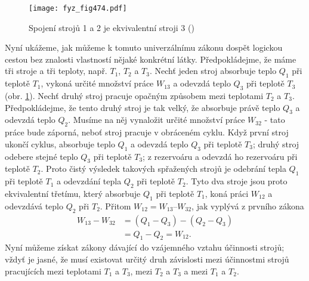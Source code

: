     \begin{figure}[ht!] %
      \centering
      \texttt{[image: fyz\_fig474.pdf]}
      \caption{Spojení strojů 1 a 2 je ekvivalentní stroji 3 (\cite[s.~707]{Feynman01})}
      \label{fyz:fig474}
    \end{figure}

    Nyní ukážeme, jak můžeme k tomuto univerzálnímu zákonu dospět logickou cestou bez znalosti
    vlastností nějaké konkrétní látky. Předpokládejme, že máme tři stroje a tři teploty, např.
    \(T_1\), \(T_2\) a \(T_3\). Nechť jeden stroj absorbuje teplo \(Q_1\) při teplotě \(T_1\),
    vykoná určité množství práce \(W_{13}\) a odevzdá teplo \(Q_3\) při teplotě \(T_3\) (obr.
    \ref{fyz:fig474}). Nechť druhý stroj pracuje opačným způsobem mezi teplotami \(T_2\) a \(T_3\).
    Předpokládejme, že tento druhý stroj je tak velký, že absorbuje právě teplo \(Q_3\) a odevzdá
    teplo \(Q_2\). Musíme na něj vynaložit určité množství práce \(W_{32}\) - tato práce bude
    záporná, neboť stroj pracuje v obráceném cyklu. Když první stroj ukončí cyklus, absorbuje teplo
    \(Q_1\) a odevzdá teplo \(Q_3\) při teplotě \(T_3\); druhý stroj odebere stejné teplo \(Q_3\)
    při teplotě \(T_3\); z rezervoáru a odevzdá ho rezervoáru při teplotě \(T_2\). Proto čistý
    výsledek takových spřažených strojů je odebrání tepla \(Q_1\) při teplotě \(T_1\) a odevzdání
    tepla \(Q_2\) při teplotě \(T_2\). Tyto dva stroje jsou proto ekvivalentní třetímu, který
    absorbuje \(Q_1\) při teplotě \(T_1\), koná práci \(W_{12}\) a odevzdává teplo \(Q_2\) při
    \(T_2\). Přitom \(W_{12} = W_{13} – W_{32}\), jak vyplývá z prvního zákona
    \begin{align}
      W_{13}−W_{32}&=(Q_1-Q_3)-(Q_2-Q_3) \nonumber \\
                   &=Q_1-Q_2=W_{12}.     \label{fyz:eq678}
    \end{align}
    Nyní můžeme získat zákony dávající do vzájemného vztahu účinnosti strojů; vždyť je jasné, že
    musí existovat určitý druh závislosti mezi účinnostmi strojů pracujících mezi teplotami \(T_1\)
    a \(T_3\), mezi \(T_2\) a \(T_3\) a mezi \(T_1\) a \(T_2\).

